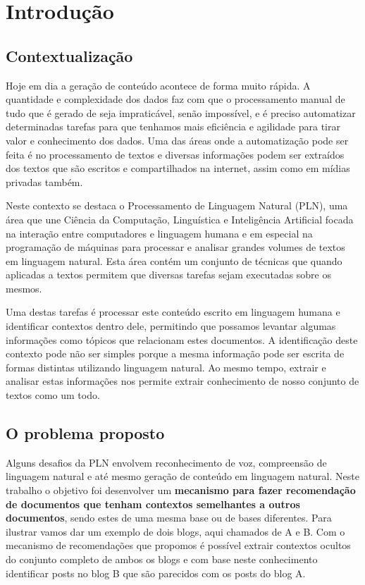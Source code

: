 \section{Introdução}

\subsection{Contextualização}

Hoje em dia a geração de conteúdo acontece de forma muito rápida. A quantidade e complexidade dos dados faz com que o processamento manual de tudo 
que é gerado de seja impraticável, senão impossível, e é preciso automatizar determinadas tarefas para que tenhamos mais eficiência e agilidade para 
tirar valor e conhecimento dos dados. Uma das áreas onde a automatização pode ser feita é no processamento de textos e diversas informações podem 
ser extraídos dos textos que são escritos e compartilhados na internet, assim como em mídias privadas também.

Neste contexto se destaca o Processamento de Linguagem Natural (PLN), uma área que une Ciência da Computação, Linguística e Inteligência Artificial 
focada na interação entre computadores e linguagem humana e em especial na programação de máquinas para processar e analisar grandes volumes de 
textos em linguagem natural. Esta área contém um conjunto de técnicas que quando aplicadas a textos permitem que diversas tarefas sejam executadas 
sobre os mesmos. 

Uma destas tarefas é processar este conteúdo escrito em linguagem humana e identificar contextos dentro dele, permitindo que possamos levantar 
algumas informações como tópicos que relacionam estes documentos. A identificação deste contexto pode não ser simples porque a mesma informação 
pode ser escrita de formas distintas utilizando linguagem natural. Ao mesmo tempo, extrair e analisar estas informações nos permite extrair 
conhecimento de nosso conjunto de textos como um todo.

\subsection{O problema proposto}

Alguns desafios da PLN envolvem reconhecimento de voz, compreensão de linguagem natural e até mesmo geração de conteúdo em linguagem natural. 
Neste trabalho o objetivo foi desenvolver um \textbf{mecanismo para fazer recomendação de documentos que tenham contextos semelhantes a outros documentos}, 
sendo estes de uma mesma base ou de bases diferentes. Para ilustrar vamos dar um exemplo de dois blogs, aqui chamados de A e B. Com o mecanismo de 
recomendações que propomos é possível extrair contextos ocultos do conjunto completo de ambos os blogs e com base neste conhecimento identificar posts 
no blog B que são parecidos com os posts do blog A.

